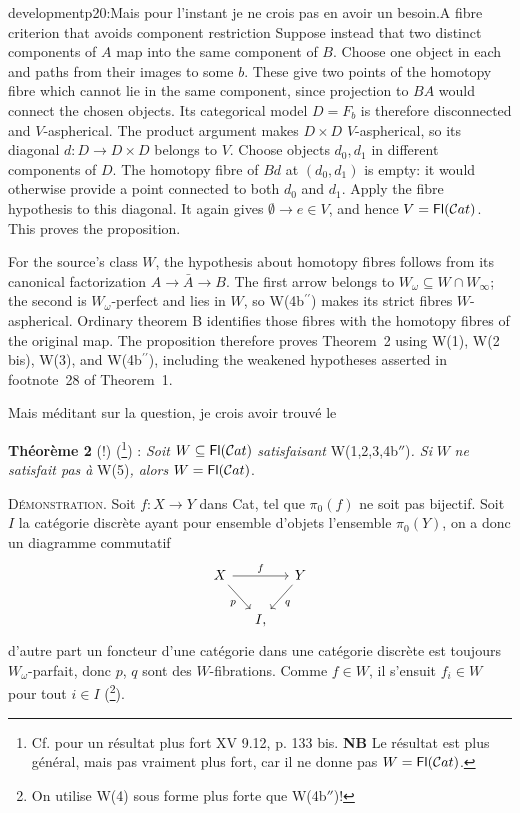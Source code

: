 \begin{dcomment}{development}{p20:Mais pour l'instant je ne crois pas en avoir un besoin.}{A fibre criterion that avoids component restriction}
Suppose instead that two distinct components of \(A\) map into the same component of \(B\). Choose one object in each and paths from their images to some \(b\). These give two points of the homotopy fibre which cannot lie in the same component, since projection to \(BA\) would connect the chosen objects. Its categorical model \(D=F_b\) is therefore disconnected and \(V\)-aspherical. The product argument makes \(D\times D\) \(V\)-aspherical, so its diagonal \(d:D\to D\times D\) belongs to \(V\). Choose objects \(d_0,d_1\) in different components of \(D\). The homotopy fibre of \(Bd\) at \((d_0,d_1)\) is empty: it would otherwise provide a point connected to both \(d_0\) and \(d_1\). Apply the fibre hypothesis to this diagonal. It again gives \(\emptyset\to e\in V\), and hence \(V=\mathsf{Fl}(\mathcal{C}at)\). This proves the proposition.

For the source's class \(W\), the hypothesis about homotopy fibres follows from its canonical factorization \(A\to\bar A\to B\). The first arrow belongs to \(W_\omega\subseteq W\cap W_\infty\); the second is \(W_\omega\)-perfect and lies in \(W\), so W(4b\(^{\prime\prime}\)) makes its strict fibres \(W\)-aspherical. Ordinary theorem B identifies those fibres with the homotopy fibres of the original map. The proposition therefore proves Theorem~2 using W(1), W(2 bis), W(3), and W(4b\(^{\prime\prime}\)), including the weakened hypotheses asserted in footnote~28 of Theorem~1.
\end{dcomment}


Mais méditant sur la question, je crois avoir trouvé le

\textbf{Théorème 2} (!) (\footnote[41]{Cf. pour un résultat plus fort XV 9.12, p. 133 bis. \textbf{NB} Le résultat est plus général, mais pas vraiment plus fort, car il ne donne pas $W = \mathsf{Fl}(\mathcal{C}at)$.}) : \textit{Soit} $W \subseteq \mathsf{Fl}(\mathcal{C}at)$ \textit{satisfaisant} W(1,2,3,4b$''$)\textit{. Si} $W$ \textit{ne satisfait pas à} W(5)\textit{, alors} $W = \mathsf{Fl}(\mathcal{C}at)$.

\textsc{Démonstration}. Soit $f : X \longrightarrow Y$ dans Cat, tel que $\pi_0(f)$ ne soit pas bijectif. Soit $I$ la catégorie discrète ayant pour ensemble d'objets l'ensemble $\pi_0(Y)$, on a donc un diagramme commutatif
\[
\begin{tikzcd}[column sep=small]
X \arrow[rr, "f"] \arrow[dr, "p"'] & & Y \arrow[dl, "q"] \\
& I, &
\end{tikzcd}
\]
d'autre part un foncteur d'une catégorie dans une catégorie discrète est toujours $W_\omega$-parfait, donc $p$, $q$ sont des $W$-fibrations. Comme $f \in W$, il s'ensuit $f_i \in W$ pour tout $i \in I$ (\footnote[42]{On utilise W(4) sous forme plus forte que W(4b$''$)!}).

